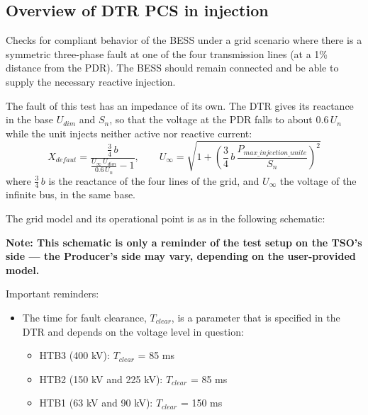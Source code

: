     \subsection{Overview of DTR PCS \DTRPcs{} in injection}

    Checks for compliant behavior of the BESS under a grid scenario where there
    is a symmetric three-phase fault at one of the four transmission lines
    (at a 1\% distance from the PDR). The BESS should remain connected and
    be able to supply the necessary reactive injection.

    The fault of this test has an impedance of its own. The DTR gives its reactance
    in the base $U_{dim}$ and $S_n$, so that the voltage at the PDR falls to
    about $0.6\,U_n$ while the unit injects neither active nor reactive current:
    \[
        X_{defaut} = \frac{\frac{3}{4}\,b}{\frac{U_\infty\,U_{dim}}{0.6\,U_n} - 1},
        \qquad
        U_\infty = \sqrt{1 + \left(\frac{3}{4}\,b\,\frac{P_{max\_injection\_unite}}{S_n}\right)^2}
    \]
    where $\frac{3}{4}\,b$ is the reactance of the four lines of the grid, and
    $U_\infty$ the voltage of the infinite bus, in the same base.

    The grid model and its operational point is as in the following schematic:
    \begin{center}
        
    \end{center}
    \begin{center}
        \small \textbf{Note: This schematic is only a reminder of the test setup on the TSO's
        side --- the Producer's side may vary, depending on the user-provided model.}
    \end{center}

    \noindent Important reminders:
    \begin{itemize}
        \item The time for fault clearance, $T_{clear}$, is a parameter that
        is specified in the DTR and depends on the voltage level in
        question:
        \begin{itemize}
            \item HTB3 (400 kV): $T_{clear}$ = 85 ms
            \item HTB2 (150 kV and 225 kV): $T_{clear}$ = 85 ms
            \item HTB1 (63 kV and 90 kV): $T_{clear}$ = 150 ms
        \end{itemize}
    \end{itemize}

